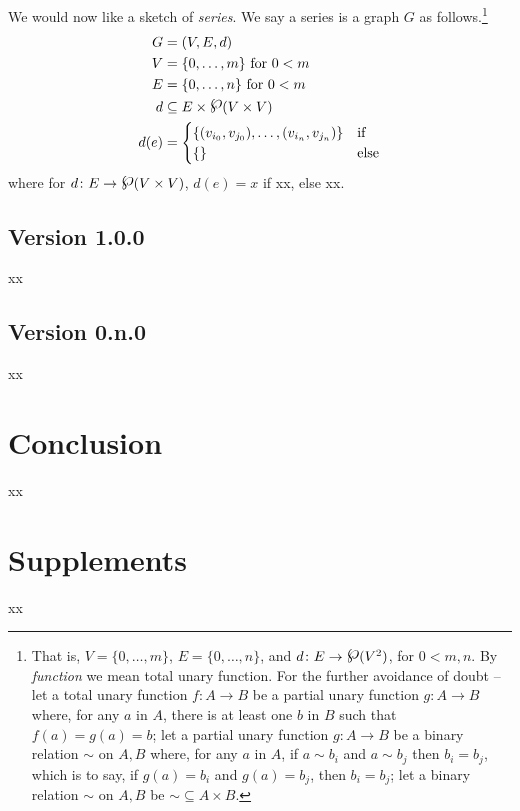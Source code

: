 \documentclass{amsart}%
\newcommand{\mention}[1]{\textit{#1}}%
\newcommand{\simset}{\mathord\sim}%
\newcommand{\powerset}{\raisebox{.15\baselineskip}{\Large\ensuremath{\wp}}}%
\theoremstyle{plain}
\theoremstyle{definition}
\theoremstyle{remark}
\theoremstyle{definition}
\theoremstyle{remark}
\begin{document}
We would now like a sketch of \mention{series}. We say a series is a graph \(G\) as follows.\footnote{That is, \(V=\{0,\ldots,m\}\), \(E=\{0,\ldots,n\}\), and \(d\colon E\to\powerset(V^2)\), for \(0<m,n\). By \mention{function} we mean total unary function. For the further avoidance of doubt -- let a total unary function \(f\colon A\to B\) be a partial unary function \(g\colon A\to B\) where, for any \(a\) in \(A\), there is at least one \(b\) in \(B\) such that \(f(a)=g(a)=b\); let a partial unary function \(g\colon A\to B\) be a binary relation \(\sim\) on \(A,B\) where, for any \(a\) in \(A\), if \(a\sim b_i\) and \(a\sim b_j\) then \(b_i=b_j\), which is to say, if \(g(a)=b_i\) and \(g(a)=b_j\), then \(b_i=b_j\); let a binary relation \(\sim\) on \(A,B\) be \(\simset\subseteq A\times B\).}
\begin{align*}
G &= (V, E, d)\\%
V &= \{0,\ldots,m\}\text{ for } 0<m\\
E &= \{0,\ldots,n\}\text{ for } 0<m\\
d &\subseteq E\times\powerset(V\times V)\\
d(e) &=\begin{cases}
\{(v_{i_0},v_{j_0}),\ldots,(v_{i_n},v_{j_n})\} & \text{if}\\
\{\} & \text{else}
\end{cases}
\end{align*}
where for \(d\colon E\to\powerset(V\times V)\), \(d(e)=x\) if xx, else xx.
%
%
%
\subsection{Version 1.0.0}
\label{ss:ver1}
xx
%
%
%
\subsection{Version 0.n.0}
\label{ss:ver0}
xx
%
%
%
%
%
\section{Conclusion}
\label{s:conc}
xx
%
%
%
%
%
%
\section*{Supplements}
\label{s:supp}
xx
%
%
%
%
\end{document}
